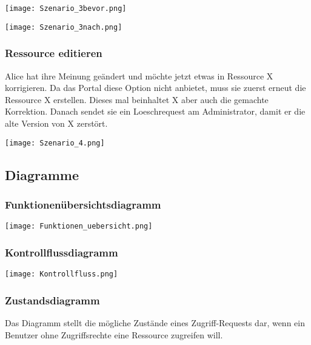 \documentclass[parskip=full,11pt]{scrartcl}
\begin{document}
	\begin{center}
	\texttt{[image: Szenario\_3bevor.png]}
	
	\texttt{[image: Szenario\_3nach.png]}
	\end{center}

\subsubsection*{Ressource editieren}
Alice hat ihre Meinung geändert und möchte jetzt etwas in Ressource X korrigieren. Da das Portal diese Option nicht anbietet, muss sie zuerst erneut die Ressource X erstellen. Dieses mal beinhaltet X aber auch die gemachte Korrektion. Danach sendet sie ein Loeschrequest am Administrator, damit er die alte Version von X zerstört.\\
	
	\begin{center}
	\texttt{[image: Szenario\_4.png]}
	\end{center}
	
\subsection{Diagramme}

\subsubsection*{Funktionenübersichtsdiagramm}

	\begin{center}
	\texttt{[image: Funktionen\_uebersicht.png]}
	\end{center}
	
\subsubsection*{Kontrollflussdiagramm \grqq}

	\begin{center}
	\texttt{[image: Kontrollfluss.png]}
	\end{center}
	
\subsubsection*{Zustandsdiagramm \grqq}
Das Diagramm stellt die mögliche Zustände eines Zugriff-Requests dar, wenn ein Benutzer ohne Zugriffsrechte eine Ressource zugreifen will.
\\
\end{document}
